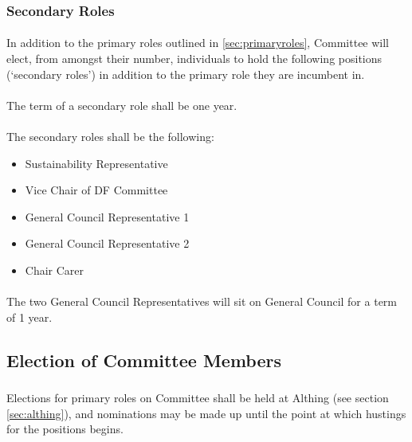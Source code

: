 \documentclass[a4paper, 11pt]{report}
\begin{document}
\subsubsection{Secondary Roles}
\label{sec:secondaryroles}

\paragraph{} In addition to the primary roles outlined in \ref{sec:primaryroles}, Committee will elect, from amongst their number, individuals to hold the following positions (`secondary roles') in addition to the primary role they are incumbent in.

\paragraph{} The term of a secondary role shall be one year.

\paragraph{} The secondary roles shall be the following:

\begin{itemize}
\item Sustainability Representative
\item Vice Chair of DF Committee
\item General Council Representative 1
\item General Council Representative 2
\item Chair Carer
\end{itemize}

\paragraph{} The two General Council Representatives will sit on General Council for a term of 1 year.

\subsection{Election of Committee Members}
\label{sec:election}
\subsubsection{}
Elections for primary roles on Committee shall be held at Althing (see section \ref{sec:althing}), and nominations may be made up until the point at which hustings for the positions begins.
\end{document}
